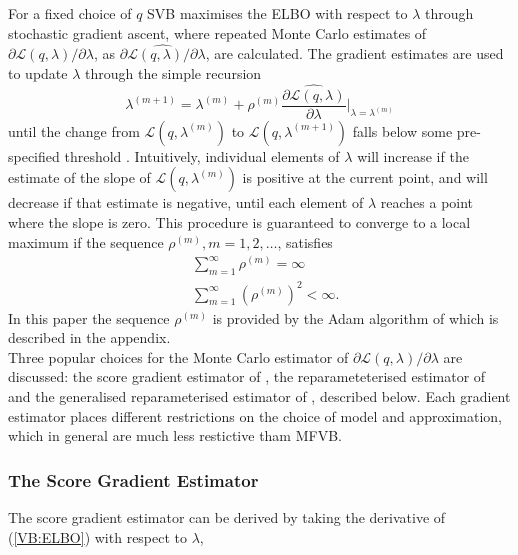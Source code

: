\documentclass[
12pt, %
onehalfspacing, %
nohyperref, %
headsepline, %
chapterinoneline, %
]{MastersDoctoralThesis} %
\begin{document}
For a fixed choice of $q$ SVB maximises the ELBO with respect to $\lambda$ through stochastic gradient ascent, where repeated Monte Carlo estimates of $\partial\mathcal{L}(q, \lambda) / \partial \lambda$, as $\widehat{\partial\mathcal{L}(q, \lambda) / \partial \lambda}$, are calculated. The gradient estimates are used to update $\lambda$ through the simple recursion
\begin{equation}
\label{SVB:gradientAscent}
\lambda^{(m+1)} = \lambda^{(m)} + \rho^{(m)} \widehat{\frac{\partial\mathcal{L}(q, \lambda)}{\partial \lambda}} \bigg\rvert_{\lambda = \lambda^{(m)}}
\end{equation}
until the change from $\mathcal{L}(q, \lambda^{(m)})$ to $\mathcal{L}(q, \lambda^{(m+1)})$ falls below some pre-specified threshold \citep{Hoffman2013}. Intuitively, individual elements of $\lambda$ will increase if the estimate of the slope of $\mathcal{L}(q, \lambda^{(m)})$ is positive at the current point, and will decrease if that estimate is negative, until each element of $\lambda$ reaches a point where the slope is zero. This procedure is guaranteed to converge to a local maximum \citep{Robbins1951} if the sequence $\rho^{(m)}, m = 1, 2 , \ldots$, satisfies
\begin{align}
&\sum_{m=1}^{\infty} \rho^{(m)} =  \infty \\
&\sum_{m=1}^{\infty} (\rho^{(m)})^2 <  \infty.
\end{align}
In this paper the sequence $\rho^{(m)}$ is provided by the Adam algorithm of \citet{Kingma2014b} which is described in the appendix.
\\

Three popular choices for the Monte Carlo estimator of $\partial\mathcal{L}(q, \lambda) / \partial \lambda$ are discussed: the score gradient estimator of \citet{Ranganath2014}, the reparameteterised estimator of \citet{Kingma2014a} and the generalised reparameterised estimator of \citet{Ruiz2016}, described below. Each gradient estimator places different restrictions on the choice of model and approximation, which in general are much less restictive tham MFVB.

\subsubsection{The Score Gradient Estimator}
\label{subsubsec:SVBScore}
The score gradient estimator can be derived by taking the derivative of (\ref{VB:ELBO}) with respect to $\lambda$, 
\end{document}
